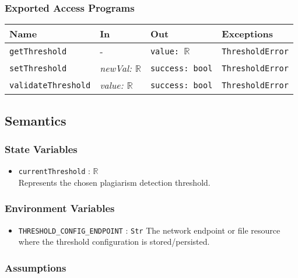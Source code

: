 \documentclass[12pt, titlepage]{article}
\begin{document}
\subsubsection{Exported Access Programs}

\begin{center}
\begin{tabular}{p{3.5cm} p{3.8cm} p{3cm} p{2.5cm}}
\hline
\textbf{Name} & \textbf{In} & \textbf{Out} & \textbf{Exceptions} \\
\hline
\texttt{getThreshold} & - & \texttt{value: $\mathbb{R}$} & \texttt{ThresholdError} \\
\texttt{setThreshold} & \textit{newVal: $\mathbb{R}$} & \texttt{success: bool} & \texttt{ThresholdError} \\
\texttt{validateThreshold} & \textit{value: $\mathbb{R}$} & \texttt{success: bool} & \texttt{ThresholdError} \\
\hline
\end{tabular}
\end{center}

\subsection{Semantics}

\subsubsection{State Variables}

\begin{itemize}
    \item \texttt{currentThreshold} : $\mathbb{R}$ \\
     Represents the chosen plagiarism detection threshold.
\end{itemize}

\subsubsection{Environment Variables}

\begin{itemize}
    \item \texttt{THRESHOLD\_CONFIG\_ENDPOINT} : \texttt{Str} The network endpoint or file resource where the threshold configuration is stored/persisted.
\end{itemize}

\subsubsection{Assumptions}
\end{document}
